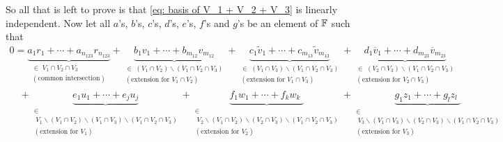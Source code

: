 \begin{xrcs}
So all that is left to prove is that \eqref{eq: basis of V_1 + V_2 + V_3} is linearly independent. Now let all $a$'s, $b$'s, $c$'s, $d$'s, $e$'s, $f$'s and $g$'s be an element of $\mathbb{F}$ such that
\begin{equation}
  \label{eq: linear independence formula}
  \begin{aligned}
  0 = \underbrace{a_1r_1 + \cdots + a_{n_{123}} r_{n_{123}}}_{\substack{\in \; V_1 \cap V_2 \cap V_3 \\ (\text{common intersection})}}
  + \underbrace{b_1v_1 + \cdots + b_{m_{12}} v_{m_{12}}}_{
      \substack{\in \; (V_1 \cap V_2) \backslash (V_1 \cap V_2 \cap V_3) \\ (\text{extension for } V_1 \cap V_2)}}
  + \underbrace{c_1\widetilde{v}_1 + \cdots + c_{m_{13}}\widetilde{v}_{m_{13}}}_{
      \substack{\in \; (V_1 \cap V_3) \backslash (V_1 \cap V_2 \cap V_3) \\ (\text{extension for } V_1 \cap V_3)}}
  + \underbrace{d_1\overline{v}_1 + \cdots + d_{m_{23}}\overline{v}_{m_{23}}}_{
      \substack{\in \; (V_2 \cap V_3) \backslash (V_1 \cap V_2 \cap V_3) \\ (\text{extension for } V_2 \cap V_3)}} \\
  \quad
  + \underbrace{e_1 u_1 + \cdots + e_j u_j}_{
    \substack{\in \\ \; V_1 \backslash (V_1 \cap V_2 ) \backslash (V_1 \cap V_3) \backslash (V_1 \cap V_2 \cap V_3)  \\ (\text{extension for } V_1)}}
  + \underbrace{f_1 w_1 + \cdots + f_k w_k \phantom{_j}\!\!\!}_{
    \substack{\in \\  \; V_2 \backslash (V_1 \cap V_2 ) \backslash (V_2 \cap V_3) \backslash (V_1 \cap V_2 \cap V_3) \\ (\text{extension for } V_2)}}
  + \underbrace{g_1 z_1 + \cdots + g_l z_l \phantom{_j}\!\!\!}_{
    \substack{\in \\ \; V_3 \backslash (V_1 \cap V_3 ) \backslash (V_2 \cap V_3) \backslash (V_1 \cap V_2 \cap V_3) \\ (\text{extension for } V_3)}}
  \end{aligned}
\end{equation}



\end{xrcs}

